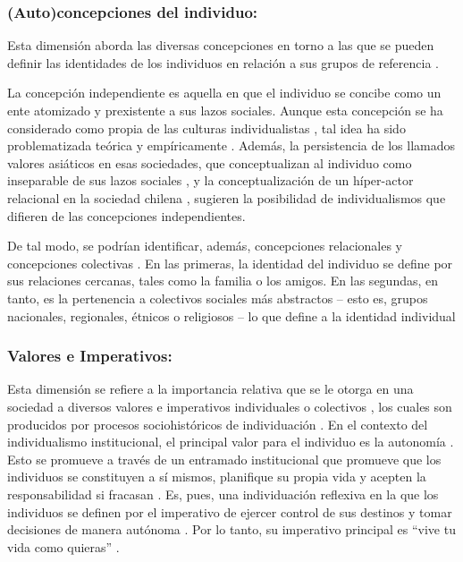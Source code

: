 \documentclass[12pt,twoside]{templates/facsothesis}
\begin{document}
\hypertarget{autoconcepciones-del-individuo}{%
\subsubsection{(Auto)concepciones del individuo:}\label{autoconcepciones-del-individuo}}

Esta dimensión aborda las diversas concepciones en torno a las que se pueden definir las identidades de los individuos en relación a sus grupos de referencia \citep{brewer2007}.

La concepción independiente es aquella en que el individuo se concibe como un ente atomizado y prexistente a sus lazos sociales. Aunque esta concepción se ha considerado como propia de las culturas individualistas \citep{benavides2020, cross2011}, tal idea ha sido problematizada teórica \citep{voronov2002} y empíricamente \citep{benavides2020, kolstad2009}. Además, la persistencia de los llamados valores asiáticos en esas sociedades, que conceptualizan al individuo como inseparable de sus lazos sociales \citep{zhai2022}, y la conceptualización de un híper-actor relacional en la sociedad chilena \citep{araujo2020}, sugieren la posibilidad de individualismos que difieren de las concepciones independientes.

De tal modo, se podrían identificar, además, concepciones relacionales y concepciones colectivas \citep{brewer2007}. En las primeras, la identidad del individuo se define por sus relaciones cercanas, tales como la familia o los amigos. En las segundas, en tanto, es la pertenencia a colectivos sociales más abstractos -- esto es, grupos nacionales, regionales, étnicos o religiosos -- lo que define a la identidad individual \citep{brewer2007}

\hypertarget{valores-e-imperativos}{%
\subsubsection{Valores e Imperativos:}\label{valores-e-imperativos}}

Esta dimensión se refiere a la importancia relativa que se le otorga en una sociedad a diversos valores e imperativos individuales o colectivos \citep{brewer2007}, los cuales son producidos por procesos sociohistóricos de individuación \citep{martuccelli2018}. En el contexto del individualismo institucional, el principal valor para el individuo es la autonomía \citep{martuccelli2010}. Esto se promueve a través de un entramado institucional \citep{martuccelli2018} que promueve que los individuos se constituyen a sí mismos, planifique su propia vida y acepten la responsabilidad si fracasan \citep{robles2001}. Es, pues, una individuación reflexiva en la que los individuos se definen por el imperativo de ejercer control de sus destinos y tomar decisiones de manera autónoma \citep{silvapalacios2015}. Por lo tanto, su imperativo principal es ``vive tu vida como quieras'' \citep{robles2001}.
\end{document}
